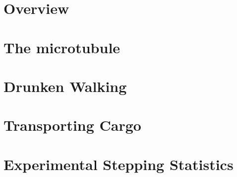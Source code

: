 \section{Overview}
\section{The microtubule}
\section{Drunken Walking}
\section{Transporting Cargo}
\section{Experimental Stepping Statistics}